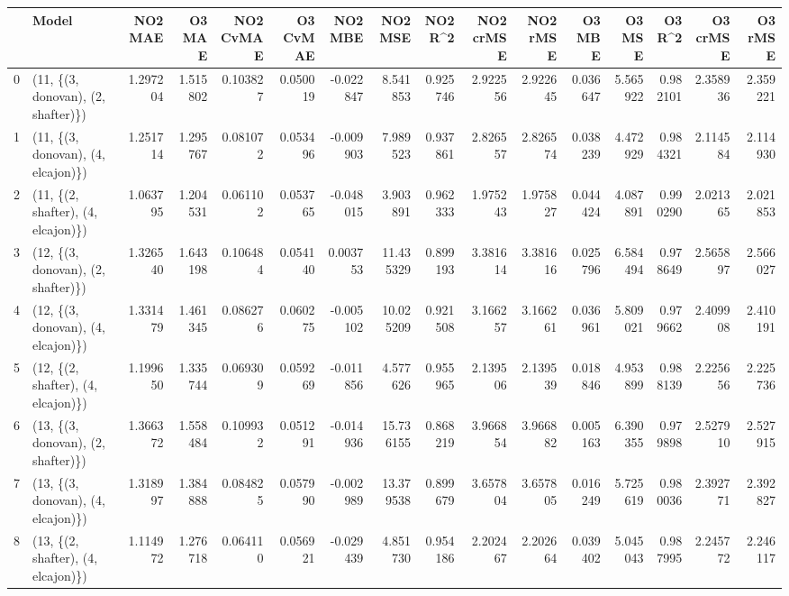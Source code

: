 \begin{tabular}{llrrrrrrrrrrrrrr}
\toprule
{} &                               Model &   NO2 MAE &    O3 MAE &  NO2 CvMAE &  O3 CvMAE &   NO2 MBE &    NO2 MSE &   NO2 R\textasciicircum2 &  NO2 crMSE &  NO2 rMSE &    O3 MBE &    O3 MSE &    O3 R\textasciicircum2 &  O3 crMSE &   O3 rMSE \\
\midrule
0  &  (11, \{(3, donovan), (2, shafter)\}) &  1.297204 &  1.515802 &   0.103827 &  0.050019 & -0.022847 &   8.541853 &  0.925746 &   2.922556 &  2.922645 &  0.036647 &  5.565922 &  0.982101 &  2.358936 &  2.359221 \\
1  &  (11, \{(3, donovan), (4, elcajon)\}) &  1.251714 &  1.295767 &   0.081072 &  0.053496 & -0.009903 &   7.989523 &  0.937861 &   2.826557 &  2.826574 &  0.038239 &  4.472929 &  0.984321 &  2.114584 &  2.114930 \\
2  &  (11, \{(2, shafter), (4, elcajon)\}) &  1.063795 &  1.204531 &   0.061102 &  0.053765 & -0.048015 &   3.903891 &  0.962333 &   1.975243 &  1.975827 &  0.044424 &  4.087891 &  0.990290 &  2.021365 &  2.021853 \\
3  &  (12, \{(3, donovan), (2, shafter)\}) &  1.326540 &  1.643198 &   0.106484 &  0.054140 &  0.003753 &  11.435329 &  0.899193 &   3.381614 &  3.381616 &  0.025796 &  6.584494 &  0.978649 &  2.565897 &  2.566027 \\
4  &  (12, \{(3, donovan), (4, elcajon)\}) &  1.331479 &  1.461345 &   0.086276 &  0.060275 & -0.005102 &  10.025209 &  0.921508 &   3.166257 &  3.166261 &  0.036961 &  5.809021 &  0.979662 &  2.409908 &  2.410191 \\
5  &  (12, \{(2, shafter), (4, elcajon)\}) &  1.199650 &  1.335744 &   0.069309 &  0.059269 & -0.011856 &   4.577626 &  0.955965 &   2.139506 &  2.139539 &  0.018846 &  4.953899 &  0.988139 &  2.225656 &  2.225736 \\
6  &  (13, \{(3, donovan), (2, shafter)\}) &  1.366372 &  1.558484 &   0.109932 &  0.051291 & -0.014936 &  15.736155 &  0.868219 &   3.966854 &  3.966882 &  0.005163 &  6.390355 &  0.979898 &  2.527910 &  2.527915 \\
7  &  (13, \{(3, donovan), (4, elcajon)\}) &  1.318997 &  1.384888 &   0.084825 &  0.057990 & -0.002989 &  13.379538 &  0.899679 &   3.657804 &  3.657805 &  0.016249 &  5.725619 &  0.980036 &  2.392771 &  2.392827 \\
8  &  (13, \{(2, shafter), (4, elcajon)\}) &  1.114972 &  1.276718 &   0.064110 &  0.056921 & -0.029439 &   4.851730 &  0.954186 &   2.202467 &  2.202664 &  0.039402 &  5.045043 &  0.987995 &  2.245772 &  2.246117 \\

\end{tabular}
